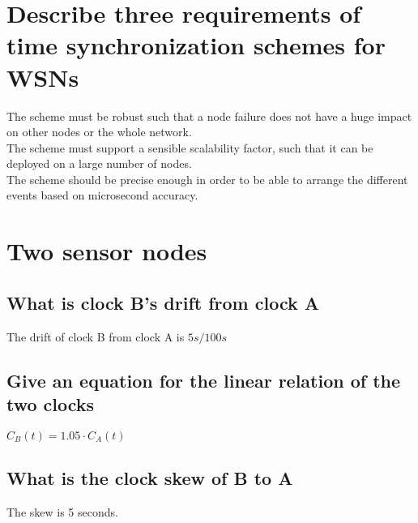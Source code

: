\documentclass{report}
\begin{document}
	\section{Describe three requirements of time synchronization schemes for WSNs}
	\startsection
		The scheme must be robust such that a node failure does not have a huge impact on other nodes or the whole network. \\
		The scheme must support a sensible scalability factor, such that it can be deployed on a large number of nodes. \\
		The scheme should be precise enough in order to be able to arrange the different events based on microsecond accuracy.
	\closesection
	
	\section{Two sensor nodes}
	\startsection
		\subsection{What is clock B's drift from clock A}
		\startsubsection
			The drift of clock B from clock A is $5s / 100s$
		\closesection
		\subsection{Give an equation for the linear relation of the two clocks}
		\startsubsection
			$C_B (t) = 1.05 \cdot C_A (t)$
		\closesection
		\subsection{What is the clock skew of B to A}
		\startsection
			The skew is 5 seconds.
		\closesection
	\closesection
\end{document}
